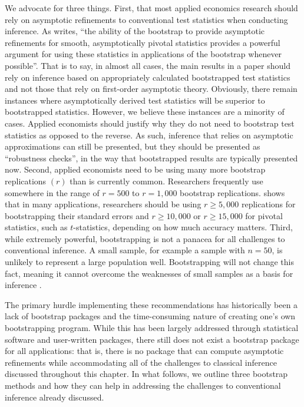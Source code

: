 \documentclass[11pt]{article}
\begin{document}
We advocate for three things. First, that most applied economics research should rely on asymptotic refinements to conventional test statistics when conducting inference. As \cite{horowitz_bootstrap_2019} writes, ``the ability of the bootstrap to provide asymptotic refinements for smooth, asymptotically pivotal statistics provides a powerful argument for using these statistics in applications of the bootstrap whenever possible''. That is to say, in almost all cases, the main results in a paper should rely on inference based on appropriately calculated bootstrapped test statistics and not those that rely on first-order asymptotic theory. Obviously, there remain instances where asymptotically derived test statistics will be superior to bootstrapped statistics. However, we believe these instances are a minority of cases. Applied economists should justify why they do not need to bootstrap test statistics as opposed to the reverse. As such, inference that relies on asymptotic approximations can still be presented, but they should be presented as ``robustness checks'', in the way that bootstrapped results are typically presented now. Second, applied economists need to be using many more bootstrap replications $(r)$ than is currently common. Researchers frequently use somewhere in the range of $r = 500$ to $r = 1,000$ bootstrap replications. \cite{hesterberg_what_2015} shows that in many applications, researchers should be using $r \geq 5,000$ replications for bootstrapping their standard errors and $r \geq 10,000$ or $r \geq 15,000$ for pivotal statistics, such as $t$-statistics, depending on how much accuracy matters. Third, while extremely powerful, bootstrapping is not a panacea for all challenges to conventional inference. A small sample, for example a sample with $n = 50$,  is unlikely to represent a large population well. Bootstrapping will not change this fact, meaning it cannot overcome the weaknesses of small samples as a basis for inference \citep{hesterberg_what_2015}.

The primary hurdle implementing these recommendations has historically been a lack of bootstrap packages and the time-consuming nature of creating one’s own bootstrapping program. While this has been largely addressed through statistical software and user-written packages, there still does not exist a bootstrap package for all applications: that is, there is no package that can compute asymptotic refinements while accommodating all of the challenges to classical inference discussed throughout this chapter. In what follows, we outline three bootstrap methods and how they can help in addressing the challenges to conventional inference already discussed.
\end{document}
